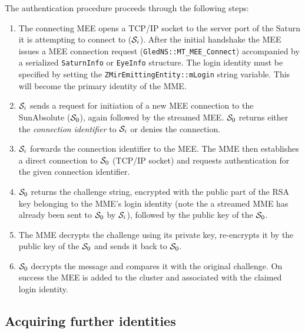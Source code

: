 \documentclass[a4paper,11pt]{article}
\def\smalltt#1{{\small\texttt{#1}}}
\begin{document}
The authentication procedure proceeds through the following steps:
\begin{enumerate}\parsep=0pt\itemsep=0pt
  
\item The connecting MEE opens a TCP/IP socket to the server port of
  the Saturn it is attempting to connect to (${\cal S}_i$). After the
  initial handshake the MEE issues a MEE connection request
  (\smalltt{GledNS::MT\_MEE\_Connect}) accompanied by a serialized
  \smalltt{SaturnInfo} or \smalltt{EyeInfo} structure. The login
  identity must be specified by setting the
  \smalltt{ZMirEmittingEntity::mLogin} string variable. This will
  become the primary identity of the MME.

\item ${\cal S}_i$ sends a request for initiation of a new MEE
  connection to the SunAbsolute (${\cal S}_0$), again followed by the
  streamed MEE. ${\cal S}_0$ returns either the \emph{connection
    identifier} to ${\cal S}_i$ or denies the connection.
  
\item ${\cal S}_i$ forwards the connection identifier to the MEE. The
  MME then establishes a direct connection to ${\cal S}_0$ (TCP/IP
  socket) and requests authentication for the given connection
  identifier.
  
\item ${\cal S}_0$ returns the challenge string, encrypted with the
  public part of the RSA key belonging to the MME's login identity
  (note the a streamed MME has already been sent to ${\cal S}_0$ by
  ${\cal S}_i$), followed by the public key of the ${\cal S}_0$.

\item The MME decrypts the challenge using its private key,
  re-encrypts it by the public key of the ${\cal S}_0$ and sends it
  back to ${\cal S}_0$.

\item ${\cal S}_0$ decrypts the message and compares it with the
  original challenge. On success the MEE is added to the cluster and
  associated with the claimed login identity.

\end{enumerate}

\subsection{Acquiring further identities}
\label{ssec:Authentication_FurtherIDS}
\end{document}

